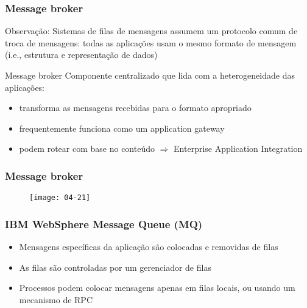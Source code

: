 \documentclass[Ligatures=TeX,table,brazil,svgnames,usetotalslideindicator,compress,10pt]{beamer}
\begin{document}
\begin{frame}
  \frametitle{Message broker}
  \begin{block}{Observação:}
    Sistemas de filas de mensagens assumem um \alert{protocolo comum de troca de mensagens}: todas as aplicações usam o mesmo formato de mensagem (i.e., estrutura e representação de dados)
  \end{block}

  \begin{block}{Message broker}
    Componente centralizado que lida com a heterogeneidade das
    aplicações:
    \begin{itemize}
    \item transforma as mensagens recebidas para o formato apropriado
    \item frequentemente funciona como um \alert{application gateway}
    \item podem rotear com \alert{base no conteúdo} $\Rightarrow$ \alert{Enterprise Application Integration}
    \end{itemize}
  \end{block}

\end{frame}

\begin{frame}
  \frametitle{Message broker}
  \begin{figure}
    \centering
    \texttt{[image: 04-21]}
  \end{figure}
\end{frame}

\begin{frame}
  \frametitle{IBM WebSphere  Message Queue (MQ)}

  \begin{itemize}
  \item \alert{Mensagens específicas da aplicação} são colocadas e removidas de \alert{filas}
  \item As filas são controladas por um \alert{gerenciador de filas}
  \item Processos podem colocar mensagens apenas em filas locais, ou usando um mecanismo de RPC
  \end{itemize}

\end{frame}
\end{document}
